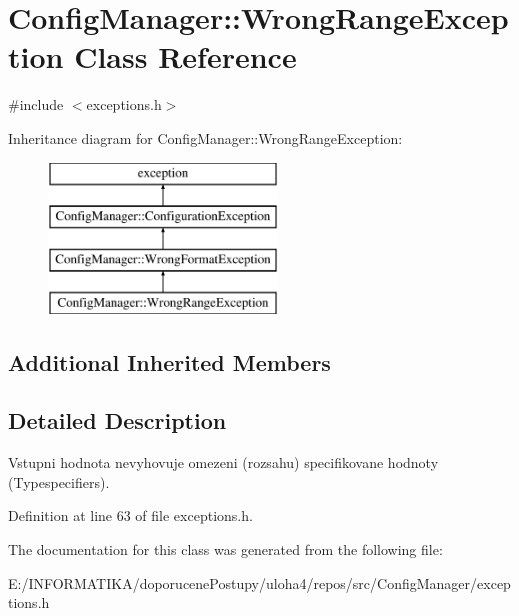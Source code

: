 \hypertarget{class_config_manager_1_1_wrong_range_exception}{}\section{Config\+Manager\+:\+:Wrong\+Range\+Exception Class Reference}
\label{class_config_manager_1_1_wrong_range_exception}


{\ttfamily \#include $<$exceptions.\+h$>$}

Inheritance diagram for Config\+Manager\+:\+:Wrong\+Range\+Exception\+:\begin{figure}[H]
\begin{center}
\leavevmode
\includegraphics[height=4.000000cm]{class_config_manager_1_1_wrong_range_exception}
\end{center}
\end{figure}
\subsection*{Additional Inherited Members}


\subsection{Detailed Description}
Vstupni hodnota nevyhovuje omezeni (rozsahu) specifikovane hodnoty (Typespecifiers). 

Definition at line 63 of file exceptions.\+h.



The documentation for this class was generated from the following file\+:\begin{DoxyCompactItemize}
\item 
E\+:/\+I\+N\+F\+O\+R\+M\+A\+T\+I\+K\+A/doporucene\+Postupy/uloha4/repos/src/\+Config\+Manager/exceptions.\+h\end{DoxyCompactItemize}
